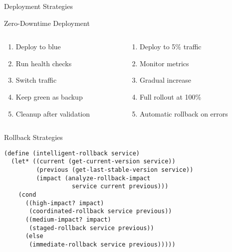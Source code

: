 \documentclass[presentation,aspectratio=169]{beamer}
\begin{document}
\begin{frame}[label={sec:org95a6dd4},fragile]{Deployment Strategies}
 \begin{block}{Zero-Downtime Deployment}
\begin{columns}
\begin{column}{0.5\columnwidth}
\begin{enumerate}
\item Deploy to blue
\item Run health checks
\item Switch traffic
\item Keep green as backup
\item Cleanup after validation
\end{enumerate}
\end{column}
\begin{column}{0.5\columnwidth}
\begin{enumerate}
\item Deploy to 5\% traffic
\item Monitor metrics
\item Gradual increase
\item Full rollout at 100\%
\item Automatic rollback on errors
\end{enumerate}
\end{column}
\end{columns}
\end{block}
\begin{block}{Rollback Strategies}
\begin{verbatim}
(define (intelligent-rollback service)
  (let* ((current (get-current-version service))
         (previous (get-last-stable-version service))
         (impact (analyze-rollback-impact
                   service current previous)))
    (cond
      ((high-impact? impact)
       (coordinated-rollback service previous))
      ((medium-impact? impact)
       (staged-rollback service previous))
      (else
       (immediate-rollback service previous)))))
\end{verbatim}
\end{block}
\end{frame}
\end{document}
